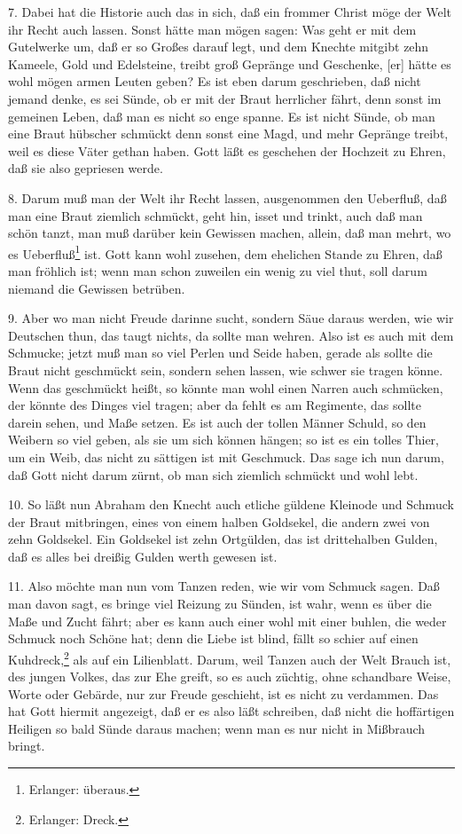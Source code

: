 7. Dabei hat die Historie auch das in sich, daß ein frommer Christ möge der Welt ihr Recht auch lassen. Sonst hätte man mögen sagen: Was geht er mit dem Gutelwerke um, daß er so Großes darauf legt, und dem Knechte mitgibt zehn Kameele, Gold und Edelsteine, treibt groß Gepränge und Geschenke, [er] hätte es wohl mögen armen Leuten geben? Es ist eben darum geschrieben, daß nicht jemand denke, es sei Sünde, ob er mit der Braut herrlicher fährt, denn sonst im gemeinen Leben, daß man es nicht so enge spanne. Es ist nicht Sünde, ob man eine Braut hübscher schmückt denn sonst eine Magd, und mehr Gepränge treibt, weil es diese Väter gethan haben. Gott läßt es geschehen der Hochzeit zu Ehren, daß sie also gepriesen werde.

8. Darum muß man der Welt ihr Recht lassen, ausgenommen den Ueberfluß, daß man eine Braut ziemlich schmückt, geht hin, isset und trinkt, auch daß man schön tanzt, man muß darüber kein Gewissen machen, allein, daß man mehrt, wo es Ueberfluß\footnote{Erlanger: überaus.} ist. Gott kann wohl
zusehen, dem ehelichen Stande zu Ehren, daß man fröhlich ist; wenn man schon zuweilen ein wenig zu viel thut, soll darum niemand die Gewissen betrüben.

9. Aber wo man nicht Freude darinne sucht, sondern Säue daraus werden, wie wir Deutschen thun, das taugt nichts, da sollte man wehren. Also ist es auch mit dem Schmucke; jetzt muß man so viel Perlen und Seide haben, gerade als sollte die Braut nicht geschmückt sein, sondern sehen lassen, wie schwer sie tragen könne. Wenn das geschmückt heißt, so könnte man wohl einen Narren auch schmücken, der könnte des Dinges viel tragen; aber da fehlt es am Regimente, das sollte darein sehen, und Maße setzen. Es ist auch der tollen Männer Schuld, so den Weibern so viel geben, als sie um sich können hängen; so ist es ein tolles Thier, um ein Weib, das nicht zu sättigen ist mit Geschmuck. Das sage ich nun darum, daß Gott nicht darum zürnt, ob man sich ziemlich schmückt und wohl lebt.

10. So läßt nun Abraham den Knecht auch etliche güldene Kleinode und Schmuck der Braut mitbringen, eines von einem halben Goldsekel, die andern zwei von zehn Goldsekel. Ein Goldsekel ist zehn Ortgülden, das ist drittehalben Gulden, daß es alles bei dreißig Gulden werth gewesen ist.

11. Also möchte man nun vom Tanzen reden, wie wir vom Schmuck sagen. Daß man davon sagt, es bringe viel Reizung zu Sünden, ist wahr, wenn es über die Maße und Zucht fährt; aber es kann auch einer wohl mit einer buhlen, die weder Schmuck noch Schöne hat; denn die Liebe ist blind, fällt so schier auf einen Kuhdreck,\footnote{Erlanger: Dreck.} als auf ein Lilienblatt. Darum, weil Tanzen auch der Welt Brauch ist, des jungen Volkes, das zur Ehe greift, so es auch züchtig, ohne schandbare Weise, Worte oder Gebärde, nur zur Freude geschieht, ist es nicht zu verdammen. Das hat Gott hiermit angezeigt, daß er es also läßt schreiben, daß nicht die hoffärtigen Heiligen so bald Sünde daraus machen; wenn man es nur nicht in Mißbrauch bringt.


